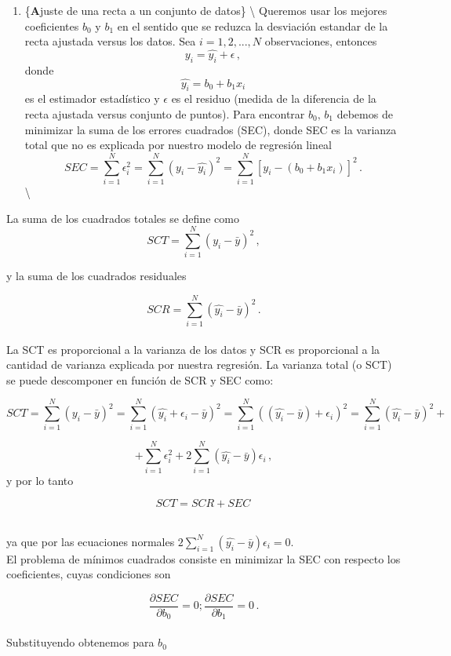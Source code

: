 \documentclass[
]{agujournal2019}
\providecommand{\tightlist}{%
  \setlength{\itemsep}{0pt}\setlength{\parskip}{0pt}}\usepackage{longtable,booktabs,array}
\begin{document}
\begin{enumerate}
\def\labelenumi{(\arabic{enumi})}
\tightlist
\item
  \{\textbf Ajuste de una recta a un conjunto de datos\}
  \textbackslash{} \noindent Queremos usar los mejores coeficientes
  \(b_0\) y \(b_1\) en el sentido que se reduzca la desviación estandar
  de la recta ajustada versus los datos. Sea \(i=1,2,...,N\)
  observaciones, entonces \[y_i=\hat{y_i} + \epsilon\,,\] donde
  \[\hat{y_i}=b_0+b_1 x_i\] es el estimador estadístico y \(\epsilon\)
  es el residuo (medida de la diferencia de la recta ajustada versus
  conjunto de puntos). Para encontrar \(b_0, \, b_1\) debemos de
  minimizar la suma de los errores cuadrados (SEC), donde SEC es la
  varianza total que no es explicada por nuestro modelo de regresión
  lineal
  \[SEC=\sum^N_{i=1} \epsilon^2_i=\sum^N_{i=1} (y_i - \hat{y_i})^2=\sum^N_{i=1} [y_i - (b_0+b_1 x_i)]^2\,.\]
  \textbackslash{}
\end{enumerate}

La suma de los cuadrados totales se define como
\[SCT=\sum^N_{i=1} (y_i - \bar{y})^2\,,\]

y la suma de los cuadrados residuales

\[SCR=\sum^N_{i=1} (\hat{y_i} - \bar{y})^2\,.\]\\

La SCT es proporcional a la varianza de los datos y SCR es proporcional
a la cantidad de varianza explicada por nuestra regresión. La varianza
total (o SCT) se puede descomponer en función de SCR y SEC como:

\[SCT=\sum^N_{i=1}(y_i-\bar{y})^2 = \sum^N_{i=1}(\hat{y_i} + \epsilon_i - \bar{y})^2
=\sum^N_{i=1}((\hat{y_i}- \bar{y}) + \epsilon_i)^2=\sum^N_{i=1}(\hat{y_i}- \bar{y})^2 +\]

\[+\sum^N_{i=1}\epsilon_i^2 + 2\sum^N_{i=1}(\hat{y_i}- \bar{y})\epsilon_i\,,\]
y por lo tanto

\[SCT=SCR + SEC\,\] ~

ya que por las ecuaciones normales
\(2\sum^N_{i=1}(\hat{y_i}- \bar{y})\epsilon_i=0\).\\

El problema de mínimos cuadrados consiste en minimizar la SEC con
respecto los coeficientes, cuyas condiciones son

\[\frac{\partial{SEC}}{\partial{b_0}}=0; \frac{\partial{SEC}}{\partial{b_1}}=0\,.\]\\

\noindent Substituyendo obtenemos para \(b_0\)
\end{document}
